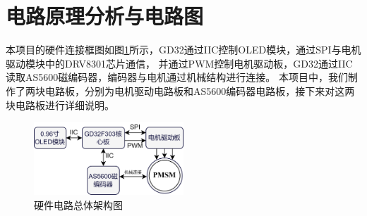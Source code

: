 ﻿\documentclass[12pt,a4paper]{article}
\begin{document}
\section{电路原理分析与电路图}
本项目的硬件连接框图如图\ref{board1}所示，GD32通过IIC控制OLED模块，通过SPI与电机驱动模块中的DRV8301芯片通信，
并通过PWM控制电机驱动板，GD32通过IIC读取AS5600磁编码器，编码器与电机通过机械结构进行连接。
本项目中，我们制作了两块电路板，分别为电机驱动电路板和AS5600编码器电路板，接下来对这两块电路板进行详细说明。
\begin{figure}[ht]
  \centering
  \includegraphics[width=0.5\textwidth]{./picture/硬件电路总体框图.drawio.png}
  \caption{硬件电路总体架构图}
  \label{board1}
\end{figure}
\end{document}
